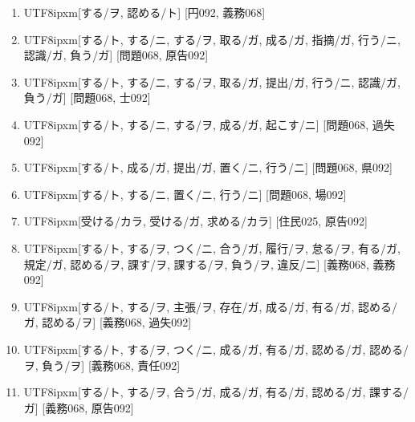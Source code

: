 \begin{enumerate}
\item \begin{CJK}{UTF8}{ipxm}[する/ヲ, 認める/ト] [円092, 義務068]\end{CJK}
\item \begin{CJK}{UTF8}{ipxm}[する/ト, する/ニ, する/ヲ, 取る/ガ, 成る/ガ, 指摘/ガ, 行う/ニ, 認識/ガ, 負う/ガ] [問題068, 原告092]\end{CJK}
\item \begin{CJK}{UTF8}{ipxm}[する/ト, する/ニ, する/ヲ, 取る/ガ, 提出/ガ, 行う/ニ, 認識/ガ, 負う/ガ] [問題068, 士092]\end{CJK}
\item \begin{CJK}{UTF8}{ipxm}[する/ト, する/ニ, する/ヲ, 成る/ガ, 起こす/ニ] [問題068, 過失092]\end{CJK}
\item \begin{CJK}{UTF8}{ipxm}[する/ト, 成る/ガ, 提出/ガ, 置く/ニ, 行う/ニ] [問題068, 県092]\end{CJK}
\item \begin{CJK}{UTF8}{ipxm}[する/ト, する/ニ, 置く/ニ, 行う/ニ] [問題068, 場092]\end{CJK}
\item \begin{CJK}{UTF8}{ipxm}[受ける/カラ, 受ける/ガ, 求める/カラ] [住民025, 原告092]\end{CJK}
\item \begin{CJK}{UTF8}{ipxm}[する/ト, する/ヲ, つく/ニ, 合う/ガ, 履行/ヲ, 怠る/ヲ, 有る/ガ, 規定/ガ, 認める/ヲ, 課す/ヲ, 課する/ヲ, 負う/ヲ, 違反/ニ] [義務068, 義務092]\end{CJK}
\item \begin{CJK}{UTF8}{ipxm}[する/ト, する/ヲ, 主張/ヲ, 存在/ガ, 成る/ガ, 有る/ガ, 認める/ガ, 認める/ヲ] [義務068, 過失092]\end{CJK}
\item \begin{CJK}{UTF8}{ipxm}[する/ト, する/ヲ, つく/ニ, 成る/ガ, 有る/ガ, 認める/ガ, 認める/ヲ, 負う/ヲ] [義務068, 責任092]\end{CJK}
\item \begin{CJK}{UTF8}{ipxm}[する/ト, する/ヲ, 合う/ガ, 成る/ガ, 有る/ガ, 認める/ガ, 課する/ガ] [義務068, 原告092]\end{CJK}

\end{enumerate}
